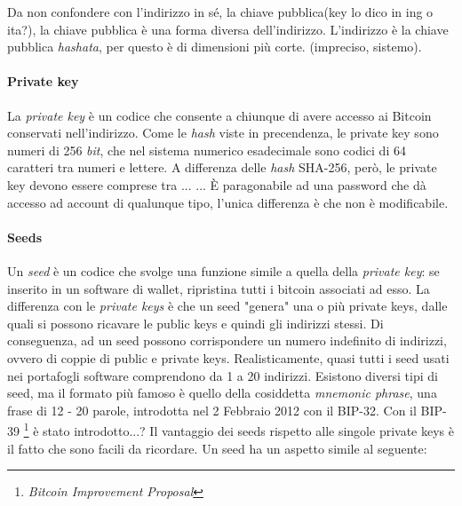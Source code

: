 \documentclass {article}
\begin{document}
Da non confondere con l'indirizzo in sé, la chiave pubblica(key lo dico in ing o ita?), la chiave pubblica è una forma diversa dell'indirizzo.
L'indirizzo è la chiave pubblica \textit{hashata}, per questo è di dimensioni più corte. (impreciso, sistemo).

\paragraph {Private key}

La \textit{private key} è un codice che consente a chiunque di avere accesso ai Bitcoin conservati nell'indirizzo.
Come le \textit{hash} viste in precendenza, le private key sono numeri di 256 \textit{bit}, che nel sistema numerico esadecimale sono codici di 64 caratteri tra numeri e lettere.
A differenza delle \textit{hash} SHA-256, però, le private key devono essere comprese tra ... ... 
È paragonabile ad una password che dà accesso ad account di qualunque tipo, l'unica differenza è che non è modificabile.

\paragraph {Seeds}

Un \textit{seed} è un codice che svolge una funzione simile a quella della \textit{private key}: se inserito in un software di wallet, ripristina tutti i bitcoin associati ad esso.
La differenza con le \textit{private keys} è che un seed "genera" una o più private keys, dalle quali si possono ricavare le public keys e quindi gli indirizzi stessi.
Di conseguenza, ad un seed possono corrispondere un numero indefinito di indirizzi, ovvero di coppie di public e private keys.
Realisticamente, quasi tutti i seed usati nei portafogli software comprendono da 1 a 20 indirizzi.
Esistono diversi tipi di seed, ma il formato più famoso è quello della cosiddetta \textit{mnemonic phrase}, una frase di 12 - 20 parole, introdotta nel 2 Febbraio 2012 con il BIP-32.
Con il BIP-39 \footnote{\textit{Bitcoin Improvement Proposal}} è stato introdotto...?
Il vantaggio dei seeds rispetto alle singole private keys è il fatto che sono facili da ricordare. Un seed ha un aspetto simile al seguente:
\end{document}
